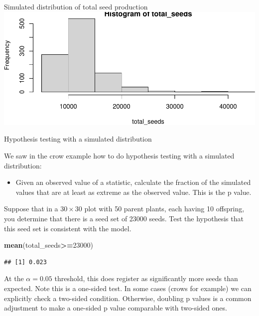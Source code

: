 \documentclass[
  ignorenonframetext,
]{beamer}
\newenvironment{Shaded}{\begin{snugshade}}{\end{snugshade}}
\newcommand{\DecValTok}[1]{\textcolor[rgb]{0.00,0.00,0.81}{#1}}
\newcommand{\KeywordTok}[1]{\textcolor[rgb]{0.13,0.29,0.53}{\textbf{#1}}}
\newcommand{\NormalTok}[1]{#1}
\newcommand{\OperatorTok}[1]{\textcolor[rgb]{0.81,0.36,0.00}{\textbf{#1}}}
\providecommand{\tightlist}{%
  \setlength{\itemsep}{0pt}\setlength{\parskip}{0pt}}
\begin{document}
\begin{frame}[fragile]{Simulated distribution of total seed production}
\includegraphics{simulation_files/figure-beamer/unnamed-chunk-20-1.pdf}

\end{frame}

\begin{frame}[fragile]{Hypothesis testing with a simulated distribution}
\protect\hypertarget{hypothesis-testing-with-a-simulated-distribution}{}

We saw in the crow example how to do hypothesis testing with a simulated
distribution:

\begin{itemize}
\tightlist
\item
  Given an observed value of a statistic, calculate the fraction of the
  simulated values that are at least as extreme as the observed value.
  This is the p value.
\end{itemize}

Suppose that in a \(30\times30\) plot with 50 parent plants, each having
10 offspring, you determine that there is a seed set of 23000 seeds.
Test the hypothesis that this seed set is consistent with the model.

\begin{Shaded}
\begin{Highlighting}[]
\KeywordTok{mean}\NormalTok{(total_seeds}\OperatorTok{>=}\DecValTok{23000}\NormalTok{)}
\end{Highlighting}
\end{Shaded}

\begin{verbatim}
## [1] 0.023
\end{verbatim}

At the \(\alpha=0.05\) threshold, this does register as significantly
more seeds than expected. Note this is a one-sided test. In some cases
(crows for example) we can explicitly check a two-sided condition.
Otherwise, doubling p values is a common adjustment to make a one-sided
p value comparable with two-sided ones.

\end{frame}
\end{document}
